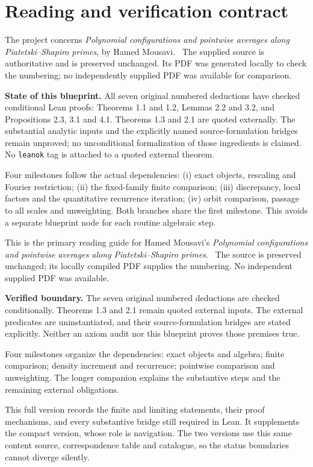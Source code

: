 \section*{Reading and verification contract}
\ifDetailed
The project concerns \emph{Polynomial configurations and pointwise averages along Piatetski--Shapiro primes}, by Hamed Mousavi. \versionnote\ The supplied source is authoritative and is preserved unchanged. Its PDF was generated locally to check the numbering; no independently supplied PDF was available for comparison.

\textbf{State of this blueprint.} All seven original numbered deductions have checked conditional Lean proofs: Theorems 1.1 and 1.2, Lemmas 2.2 and 3.2, and Propositions 2.3, 3.1 and 4.1. Theorems 1.3 and 2.1 are quoted externally. The substantial analytic inputs and the explicitly named source-formulation bridges remain unproved; no unconditional formalization of those ingredients is claimed. No \texttt{leanok} tag is attached to a quoted external theorem.

Four milestones follow the actual dependencies: (i) exact objects, rescaling and Fourier restriction; (ii) the fixed-family finite comparison; (iii) discrepancy, local factors and the quantitative recurrence iteration; (iv) orbit comparison, passage to all scales and unweighting. Both branches share the first milestone. This avoids a separate blueprint node for each routine algebraic step.

\else
This is the primary reading guide for Hamed Mousavi's \emph{Polynomial configurations and pointwise averages along Piatetski--Shapiro primes}. \versionnote\ The source is preserved unchanged; its locally compiled PDF supplies the numbering. No independent supplied PDF was available.

\textbf{Verified boundary.} The seven original numbered deductions are checked conditionally. Theorems 1.3 and 2.1 remain quoted external inputs. The external predicates are uninstantiated, and their source-formulation bridges are stated explicitly. Neither an axiom audit nor this blueprint proves those premises true.

Four milestones organize the dependencies: exact objects and algebra; finite comparison; density increment and recurrence; pointwise comparison and unweighting. The longer companion explains the substantive steps and the remaining external obligations.
\fi

\ifDetailed
This full version records the finite and limiting statements, their proof mechanisms, and every substantive bridge still required in Lean. It supplements the compact version, whose role is navigation. The two versions use this same content source, correspondence table and catalogue, so the status boundaries cannot diverge silently.

